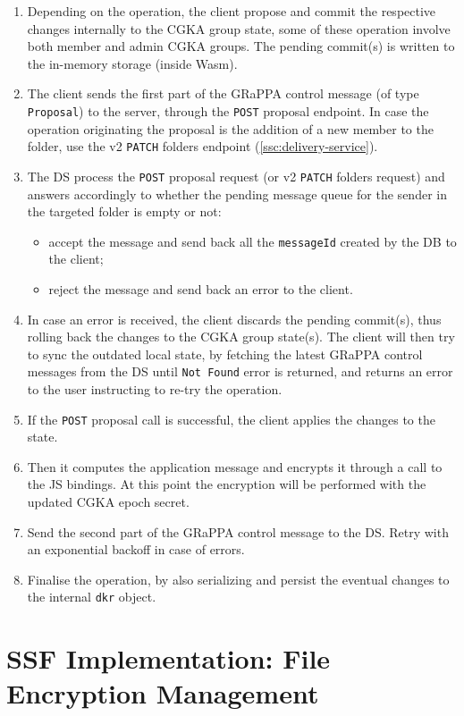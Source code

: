 \begin{enumerate}
    \item Depending on the operation, the client propose and commit the respective changes internally to the CGKA group state, some of these operation involve both member and admin CGKA groups. The pending commit(s) is written to the in-memory storage (inside Wasm).
    \item The client sends the first part of the GRaPPA control message (of type \texttt{Proposal}) to the server, through the \texttt{POST} proposal endpoint. In case the operation originating the proposal is the addition of a new member to the folder, use the v2 \texttt{PATCH} folders endpoint (\cref{ssc:delivery-service}).
    \item The DS process the \texttt{POST} proposal request (or v2 \texttt{PATCH} folders request) and answers accordingly to whether the pending message queue for the sender in the targeted folder is empty or not:
    \begin{itemize}
        \item accept the message and send back all the \texttt{messageId} created by the DB to the client;
        \item reject the message and send back an error to the client.
    \end{itemize}
    \item In case an error is received, the client discards the pending commit(s), thus rolling back the changes to the CGKA group state(s). The client will then try to sync the outdated local state, by fetching the latest GRaPPA control messages from the DS until \texttt{Not Found} error is returned, and returns an error to the user instructing to re-try the operation.
    \item If the \texttt{POST} proposal call is successful, the client applies the changes to the state. 
    \item Then it computes the application message and encrypts it through a call to the JS bindings. At this point the encryption will be performed with the updated CGKA epoch secret. 
    \item Send the second part of the GRaPPA control message to the DS. Retry with an exponential backoff in case of errors.
    \item Finalise the operation, by also serializing and persist the eventual changes to the internal \texttt{dkr} object.
\end{enumerate}

\section{SSF Implementation: File Encryption Management}\label{sc:ssf-file-encryption}

